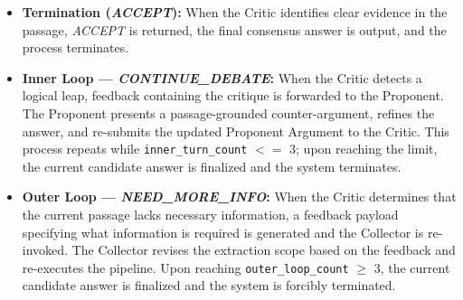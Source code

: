 \begin{itemize}
  \item \textbf{Termination (\textit{ACCEPT}):}
    When the Critic identifies clear evidence in the passage, \textit{ACCEPT} is returned, the final consensus answer is output, and the process terminates.

  \item \textbf{Inner Loop --- \textit{CONTINUE\_DEBATE}:}
    When the Critic detects a logical leap, feedback containing the critique is forwarded to the Proponent.
    The Proponent presents a passage-grounded counter-argument, refines the answer, and re-submits the updated Proponent Argument to the Critic.
    This process repeats while \texttt{inner\_turn\_count} $<=$ 3; upon reaching the limit, the current candidate answer is finalized and the system terminates.

  \item \textbf{Outer Loop --- \textit{NEED\_MORE\_INFO}:}
    When the Critic determines that the current passage lacks necessary information, a feedback payload specifying what information is required is generated and the Collector is re-invoked.
    The Collector revises the extraction scope based on the feedback and re-executes the pipeline.
    Upon reaching \texttt{outer\_loop\_count} $\geq$ 3, the current candidate answer is finalized and the system is forcibly terminated.




\end{itemize}

